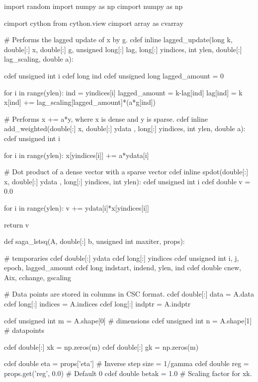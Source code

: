 \documentclass{article}
\begin{document}
\begin{python}
import random
import numpy as np
cimport numpy as np

cimport cython
from cython.view cimport array as cvarray

# Performs the lagged update of x by g.
cdef inline lagged_update(long k, double[:] x, double[:] g, unsigned long[:] lag, 
                          long[:] yindices, int ylen, double[:] lag_scaling, double a):
    
    cdef unsigned int i
    cdef long ind
    cdef unsigned long lagged_amount = 0
    
    for i in range(ylen):
        ind = yindices[i]
        lagged_amount = k-lag[ind]
        lag[ind] = k
        x[ind] += lag_scaling[lagged_amount]*(a*g[ind])
        

# Performs x += a*y, where x is dense and y is sparse.
cdef inline add_weighted(double[:] x, double[:] ydata , long[:] yindices, int ylen, double a):
    cdef unsigned int i
    
    for i in range(ylen):
        x[yindices[i]] += a*ydata[i]

# Dot product of a dense vector with a sparse vector
cdef inline spdot(double[:] x, double[:] ydata , long[:] yindices, int ylen):
    cdef unsigned int i
    cdef double v = 0.0
    
    for i in range(ylen):
        v += ydata[i]*x[yindices[i]]
        
    return v

def saga_lstsq(A,  double[:] b, unsigned int maxiter, props):
    
    # temporaries
    cdef double[:] ydata
    cdef long[:] yindices
    cdef unsigned int i, j, epoch, lagged_amount
    cdef long indstart, indend, ylen, ind
    cdef double cnew, Aix, cchange, gscaling
    
    # Data points are stored in columns in CSC format.
    cdef double[:] data = A.data
    cdef long[:] indices = A.indices
    cdef long[:] indptr = A.indptr
    
    cdef unsigned int m = A.shape[0] # dimensions
    cdef unsigned int n = A.shape[1] # datapoints
    
    cdef double[:] xk = np.zeros(m)
    cdef double[:] gk = np.zeros(m)
    
    cdef double eta = props['eta'] # Inverse step size = 1/gamma
    cdef double reg = props.get('reg', 0.0) # Default 0
    cdef double betak = 1.0 # Scaling factor for xk.
    

\end{python}
\end{document}
